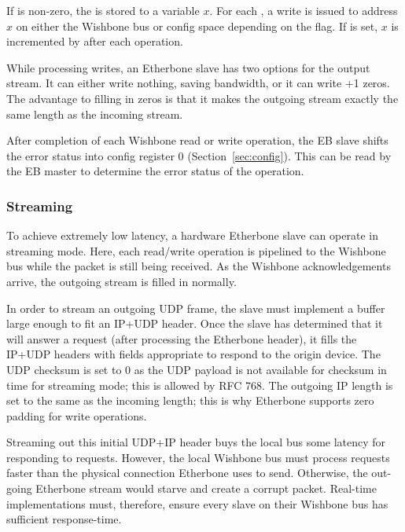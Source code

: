 \documentclass{article}
\begin{document}
If  is non-zero,
the  is stored to a variable $x$.
For each , 
a write is issued to address $x$ on either the Wishbone bus or config space
depending on the  flag.
If  is set, 
$x$ is incremented by  after each operation.

While processing writes,
an Etherbone slave has two options for the output stream.
It can either write nothing, saving bandwidth,
or it can write +1 zeros.
The advantage to filling in zeros is that it makes the outgoing stream exactly
the same length as the incoming stream.

After completion of each Wishbone read or write operation,
the EB slave shifts the error status into config register 0
(Section~\ref{sec:config}).
This can be read by the EB master to determine the error status of the
operation.

\subsubsection{Streaming}
\label{sec:cut}

To achieve extremely low latency,
a hardware Etherbone slave can operate in streaming mode.
Here, 
each read/write operation is pipelined to the Wishbone bus
while the packet is still being received.
As the Wishbone acknowledgements arrive,
the outgoing stream is filled in normally.

In order to stream an outgoing UDP frame,
the slave must implement a buffer large enough to fit an IP+UDP header.
Once the slave has determined that it will answer a request
(after processing the Etherbone header),
it fills the IP+UDP headers with fields appropriate 
to respond to the origin device.
The UDP checksum is set to 0 as the UDP payload is not available for
checksum in time for streaming mode;
this is allowed by RFC 768.
The outgoing IP length is set to the same as the incoming length;
this is why Etherbone supports zero padding for write operations.

Streaming out this initial UDP+IP header buys the local bus some 
latency for responding to requests.
However, the local Wishbone bus must process requests faster than the
physical connection Etherbone uses to send.
Otherwise, the out-going Etherbone stream would starve and create a 
corrupt packet.
Real-time implementations must, therefore, 
ensure every slave on their Wishbone bus has sufficient response-time.
\end{document}
